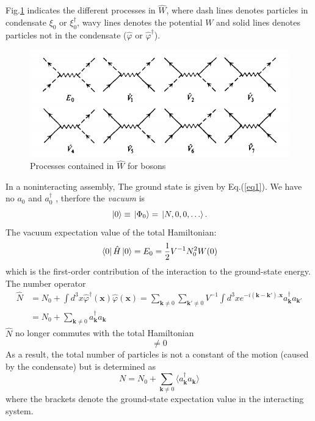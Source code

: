 \documentclass[12pt]{article}
\begin{document}
Fig.\ref{img1} indicates the different processes in $\hat{W}$, where dash lines denotes 
particles in condensate $\xi_0$ or $\xi^\dagger_0$, wavy lines denotes the potential 
$W$ and solid lines denotes particles not in the condensate ($\hat{\varphi}$ or 
$\hat{\varphi}^\dagger$).
\begin{figure}[H]
    \centering
    \includegraphics[width=13cm]{p1.png}
    \renewcommand{\figurename}{Fig.}
    \caption{Processes contained in $\hat{W}$ for bosons}
    \label{img1}
\end{figure}

In a noninteracting assembly, The ground state is given by Eq.(\ref{eq1}). We have no 
$a_0$ and $a^\dagger_0$ , therfore the \emph{vacuum} is 
\begin{equation}
    \ket*{0}\equiv\ket*{\Phi_0}=\ket*{N,0,0,\dots}.
\end{equation}
The vacuum expectation value of the total Hamiltonian:
\begin{equation}
    \bra*{0}\hat{H}\ket*{0}=E_0=\frac{1}{2}V^{-1}N_0^2W(0)
\end{equation}
which is the first-order contribution of the interaction to the ground-state energy.
The number operator 
\begin{equation}
    \begin{split}
        \hat{N}&=N_0+\int d^3x\hat{\varphi}^\dagger(\mathbf{x})\hat{\varphi}(\mathbf{x})
        =\sum_{\mathbf{k}\neq 0}\sum_{\mathbf{k}'\neq 0}V^{-1}\int d^3x
        e^{-i(\mathbf{k}-\mathbf{k}').\mathbf{x}}a_\mathbf{k}^\dagger a_{\mathbf{k}'}\\
        &=N_0+\sum_{\mathbf{k}\neq 0}a^\dagger_\mathbf{k}a_\mathbf{k}
    \end{split}
\end{equation}
$\hat{N}$ no longer commutes with the total Hamiltonian
\begin{equation}
    [\hat{T}+E_0+\hat{W}_1+\cdots+\hat{W}_7,\hat{N}]\neq 0
\end{equation}
As a result, the total number of particles is not a constant of the motion (caused by 
the condensate) but is 
determined as 
\begin{equation}
    N=N_0+\sum_{\mathbf{k}\neq 0}\langle a^\dagger_\mathbf{k}a_\mathbf{k}\rangle
\end{equation}
where the brackets denote the ground-state expectation value in the interacting system.
\end{document}

